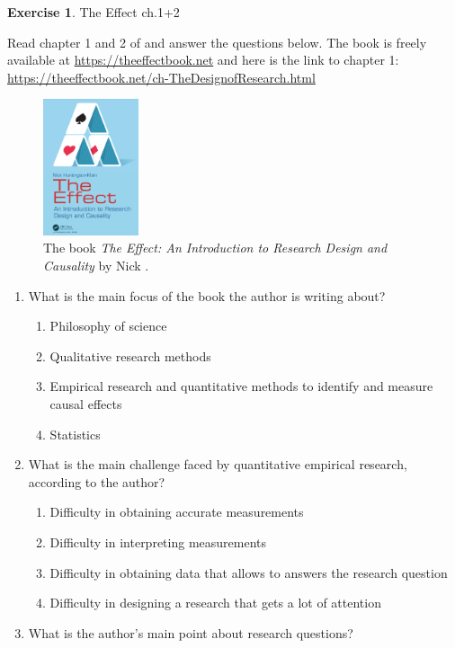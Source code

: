 \documentclass[
  12pt,
  oneside]{book}
\providecommand{\tightlist}{%
  \setlength{\itemsep}{0pt}\setlength{\parskip}{0pt}}
\theoremstyle{definition}
\theoremstyle{definition}
\theoremstyle{definition}
\newtheorem{exercise}{Exercise}[chapter]
\theoremstyle{definition}
\theoremstyle{remark}
\begin{document}
\begin{exercise}
\protect\hypertarget{exr:effect1u2}{}\label{exr:effect1u2}The Effect ch.1+2

Read chapter 1 and 2 of \citet{Huntington-Klein2022Effect} and answer the questions below. The book is freely available at \url{https://theeffectbook.net} and here is the link to chapter 1: \url{https://theeffectbook.net/ch-TheDesignofResearch.html}

\begin{figure}
\centering
\includegraphics[width=0.25\textwidth,height=\textheight]{fig/cover-effect.png}
\caption{\label{fig:theeffect} The book \emph{The Effect: An Introduction to Research Design and Causality} by Nick \citet{Huntington-Klein2022Effect}.}
\end{figure}

\begin{enumerate}
\def\labelenumi{\arabic{enumi}.}
\tightlist
\item
  What is the main focus of the book the author is writing about?

  \begin{enumerate}
  \def\labelenumii{\alph{enumii})}
  \tightlist
  \item
    Philosophy of science
  \item
    Qualitative research methods
  \item
    Empirical research and quantitative methods to identify and measure causal effects
  \item
    Statistics
  \end{enumerate}
\item
  What is the main challenge faced by quantitative empirical research, according to the author?

  \begin{enumerate}
  \def\labelenumii{\alph{enumii})}
  \tightlist
  \item
    Difficulty in obtaining accurate measurements
  \item
    Difficulty in interpreting measurements
  \item
    Difficulty in obtaining data that allows to answers the research question
  \item
    Difficulty in designing a research that gets a lot of attention
  \end{enumerate}
\item
  What is the author's main point about research questions?


\end{enumerate}
\end{exercise}
\end{document}
